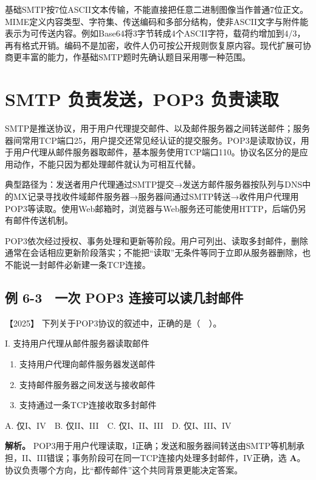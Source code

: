 基础SMTP按7位ASCII文本传输，不能直接把任意二进制图像当作普通7位正文。MIME定义内容类型、字符集、传送编码和多部分结构，使非ASCII文字与附件能表示为可传送内容。例如Base64将3字节转成4个ASCII字符，载荷约增加到4/3，再有格式开销。编码不是加密，收件人仍可按公开规则恢复原内容。现代扩展可协商更丰富的能力，作基础SMTP题时先确认题目采用哪一种范围。

\section{SMTP 负责发送，POP3 负责读取}\label{cn-06-06}

SMTP是推送协议，用于用户代理提交邮件、以及邮件服务器之间转送邮件；服务器间常用TCP端口25，用户提交还常见经认证的提交服务。POP3是读取协议，用于用户代理从邮件服务器取邮件，基本服务使用TCP端口110。协议名区分的是应用动作，不能只因为都处理邮件就认为可相互代替。

典型路径为：发送者用户代理通过SMTP提交→发送方邮件服务器按队列与DNS中的MX记录寻找收件域邮件服务器→服务器间通过SMTP转送→收件用户代理用POP3等读取。使用Web邮箱时，浏览器与Web服务还可能使用HTTP，后端仍另有邮件传送机制。

POP3依次经过授权、事务处理和更新等阶段。用户可列出、读取多封邮件，删除通常在会话相应更新阶段落实；不能把``读取''无条件等同于立即从服务器删除，也不能说一封邮件必新建一条TCP连接。

\subsection{例 6-3　一次 POP3 连接可以读几封邮件}\label{cn-ex6-3}

\noindent{}【2025】 下列关于POP3协议的叙述中，正确的是（　）。

I. 支持用户代理从邮件服务器读取邮件

\begin{enumerate}
\def\labelenumi{\Roman{enumi}.}
\setcounter{enumi}{1}
\item
  支持用户代理向邮件服务器发送邮件
\item
  支持邮件服务器之间发送与接收邮件
\item
  支持通过一条TCP连接收取多封邮件
\end{enumerate}

A. 仅I、IV　B. 仅II、III　C. 仅I、II、III　D. 仅I、III、IV


\textbf{解析。} POP3用于用户代理读取，I正确；发送和服务器间转送由SMTP等机制承担，II、III错误；事务阶段可在同一TCP连接内处理多封邮件，IV正确，选 \textbf{A}。协议负责哪个方向，比``都传邮件''这个共同背景更能决定答案。

